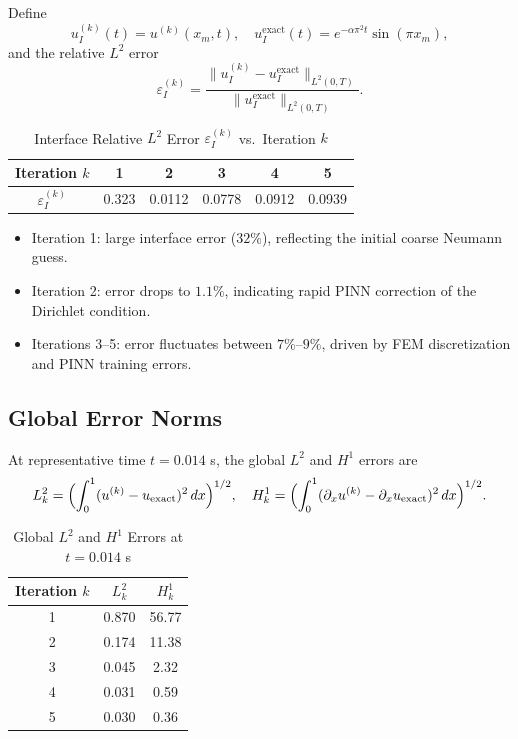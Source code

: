 \documentclass[12pt]{article}
\begin{document}
Define
\begin{equation}
  u_I^{(k)}(t) = u^{(k)}(x_m,t),\quad
  u_I^{\mathrm{exact}}(t) = e^{-\alpha\pi^2 t}\sin(\pi x_m),
\end{equation}
and the relative \(L^2\) error
\begin{equation}
  \varepsilon_I^{(k)}
  = \frac{\|u_I^{(k)} - u_I^{\mathrm{exact}}\|_{L^2(0,T)}}
         {\|u_I^{\mathrm{exact}}\|_{L^2(0,T)}}.
\end{equation}
\begin{table}[htbp]
\centering
\caption{Interface Relative \(L^2\) Error \(\varepsilon_I^{(k)}\) vs.\ Iteration \(k\)}
\label{tab:interface_error}
\begin{tabular}{cccccc}
\toprule
Iteration \(k\) & 1     & 2      & 3      & 4      & 5      \\
\midrule
\(\varepsilon_I^{(k)}\) & 0.323 & 0.0112 & 0.0778 & 0.0912 & 0.0939 \\
\bottomrule
\end{tabular}
\end{table}

\begin{itemize}
  \item Iteration 1: large interface error (\(32\%\)), reflecting the initial coarse Neumann guess.
  \item Iteration 2: error drops to \(1.1\%\), indicating rapid PINN correction of the Dirichlet condition.
  \item Iterations 3–5: error fluctuates between \(7\%\)–\(9\%\), driven by FEM discretization and PINN training errors.
\end{itemize}

\subsection{Global Error Norms}

At representative time \(t=0.014\) s, the global \(L^2\) and \(H^1\) errors are
\begin{equation}
  L^2_k = \Bigl(\int_0^1 (u^{(k)}-u_{\mathrm{exact}})^2\,dx\Bigr)^{1/2},\quad
  H^1_k = \Bigl(\int_0^1 (\partial_xu^{(k)}-\partial_xu_{\mathrm{exact}})^2\,dx\Bigr)^{1/2}.
\end{equation}
\begin{table}[htbp]
\centering
\caption{Global \(L^2\) and \(H^1\) Errors at \(t=0.014\) s}
\label{tab:global_errors}
\begin{tabular}{ccc}
\toprule
Iteration \(k\) & \(L^2_k\) & \(H^1_k\) \\
\midrule
1 & 0.870 & 56.77 \\
2 & 0.174 & 11.38 \\
3 & 0.045 & 2.32  \\
4 & 0.031 & 0.59  \\
5 & 0.030 & 0.36  \\
\bottomrule
\end{tabular}
\end{table}
\end{document}
